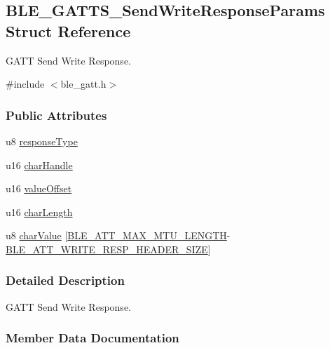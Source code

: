 \hypertarget{struct_b_l_e___g_a_t_t_s___send_write_response_params}{}\subsection{B\+L\+E\+\_\+\+G\+A\+T\+T\+S\+\_\+\+Send\+Write\+Response\+Params Struct Reference}
\label{struct_b_l_e___g_a_t_t_s___send_write_response_params}


G\+A\+TT Send Write Response.  




{\ttfamily \#include $<$ble\+\_\+gatt.\+h$>$}

\subsubsection*{Public Attributes}
\begin{DoxyCompactItemize}
\item 
u8 \hyperlink{struct_b_l_e___g_a_t_t_s___send_write_response_params_a672993b34e4dc4f5ec3b90819792d933}{response\+Type}
\item 
u16 \hyperlink{struct_b_l_e___g_a_t_t_s___send_write_response_params_a84553233f6ccb5545f39b685701c5de3}{char\+Handle}
\item 
u16 \hyperlink{struct_b_l_e___g_a_t_t_s___send_write_response_params_ac9ba88704ea2551282572e9a6e20f05a}{value\+Offset}
\item 
u16 \hyperlink{struct_b_l_e___g_a_t_t_s___send_write_response_params_a47fc7776a87691c4a4c904360bbb1676}{char\+Length}
\item 
u8 \hyperlink{struct_b_l_e___g_a_t_t_s___send_write_response_params_a4e13604ab12673ec85fa6507c56eb5ad}{char\+Value} \mbox{[}\hyperlink{group___b_l_e___g_a_t_t_ga380151ce5e77dadfae069f37afd70b8b}{B\+L\+E\+\_\+\+A\+T\+T\+\_\+\+M\+A\+X\+\_\+\+M\+T\+U\+\_\+\+L\+E\+N\+G\+TH}-\/\hyperlink{group___b_l_e___g_a_t_t_ga6a4807bfe93a96506caa739c30038acd}{B\+L\+E\+\_\+\+A\+T\+T\+\_\+\+W\+R\+I\+T\+E\+\_\+\+R\+E\+S\+P\+\_\+\+H\+E\+A\+D\+E\+R\+\_\+\+S\+I\+ZE}\mbox{]}
\end{DoxyCompactItemize}


\subsubsection{Detailed Description}
G\+A\+TT Send Write Response. 

\subsubsection{Member Data Documentation}

